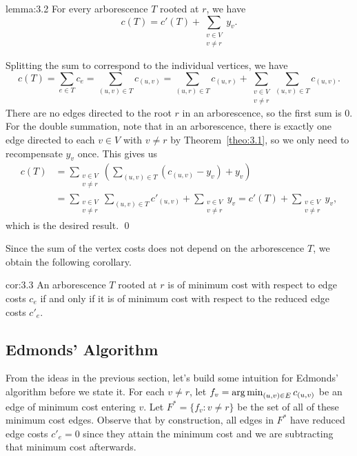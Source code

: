 \begin{lemma}{lemma:3.2}
    For every arborescence $T$ rooted at $r$, we have 
    \[ c(T) = c'(T) + \sum_{\substack{v\in V \\ v\neq r}} y_v. \] 
\end{lemma}\vspace{-0.25cm}
\begin{pf}
    Splitting the sum to correspond to the individual vertices, we have 
    \[ c(T) = \sum_{e\in T} c_e = \sum_{(u, v) \in T} c_{(u,v)} 
    = \sum_{(u, r) \in T} c_{(u,r)} + \sum_{\substack{v\in V\\ v\neq r}} 
    \sum_{(u, v) \in T} c_{(u, v)}. \] 
    There are no edges directed to the root $r$ in an arborescence, so 
    the first sum is $0$. For the double summation, note that in an 
    arborescence, there is exactly one edge directed to each $v \in V$ 
    with $v \neq r$ by Theorem~\ref{theo:3.1}, so we only need to recompensate 
    $y_v$ once. This gives us 
    \begin{align*}
        c(T) &= \sum_{\substack{v\in V\\ v \neq r}} \left( \sum_{(u, v) \in T} (c_{(u, v)} - y_v) + y_v \right) \\
        &= \sum_{\substack{v\in V\\ v \neq r}} \sum_{(u, v) \in T} c'_{(u,v)} + \sum_{\substack{v\in V\\ v \neq r}} y_v 
        = c'(T) + \sum_{\substack{v\in V\\ v \neq r}} y_v,
    \end{align*}
    which is the desired result. \qed
\end{pf}\vspace{-0.25cm}

Since the sum of the vertex costs does not depend on the arborescence 
$T$, we obtain the following corollary. 

\begin{cor}{cor:3.3}
    An arborescence $T$ rooted at $r$ is of minimum cost with respect to 
    edge costs $c_e$ if and only if it is of minimum cost with respect 
    to the reduced edge costs $c'_e$. 
\end{cor}

\subsection{Edmonds' Algorithm}
From the ideas in the previous section, let's build
some intuition for Edmonds' algorithm before we state it. For each $v \neq r$, 
let $f_v = \operatorname*{arg\,min}_{(u, v) \in E} c_{(u, v)}$ be an edge of minimum cost 
entering $v$. Let $F^* = \{f_v : v \neq r\}$ be the set of all of these 
minimum cost edges. Observe that by construction, all edges in $F^*$ have 
reduced edge costs $c'_e = 0$ since they attain the minimum cost 
and we are subtracting that minimum cost afterwards.

